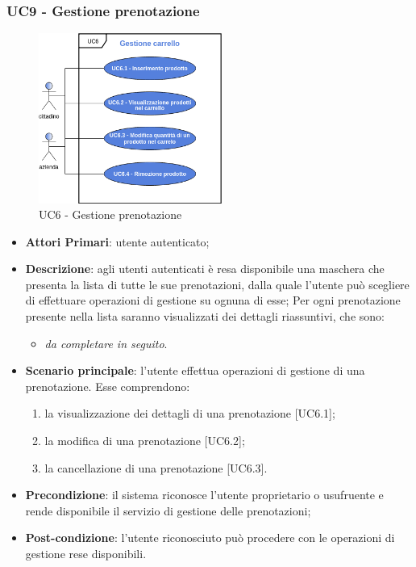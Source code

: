 \subsubsection{UC9 - Gestione prenotazione}
 \begin{figure}[h]
	\includegraphics[width=6cm]{res/images/UC6GestioneCarrello.png}
	\centering
	\caption{UC6 - Gestione prenotazione}
\end{figure}
\begin{itemize}
	\item \textbf{Attori Primari}: utente autenticato;
	\item \textbf{Descrizione}: agli utenti autenticati è resa disponibile una maschera che presenta la lista di tutte le sue prenotazioni, dalla quale l'utente può scegliere di effettuare operazioni di gestione su ognuna di esse;
	Per ogni prenotazione presente nella lista saranno visualizzati dei dettagli riassuntivi, che sono:
	\begin{itemize}
		\item \textit{da completare in seguito}.
	\end{itemize}
	\item \textbf{Scenario principale}: l'utente effettua operazioni di gestione di una prenotazione. Esse comprendono:
	\begin{enumerate}[label=\alph*.]
		\item la visualizzazione dei dettagli di una prenotazione [UC6.1];
		\item la modifica di una prenotazione [UC6.2];
		\item la cancellazione di una prenotazione [UC6.3].
	\end{enumerate}
	\item \textbf{Precondizione}: il sistema riconosce l'utente proprietario o usufruente e rende disponibile il servizio di gestione delle prenotazioni;
	\item \textbf{Post-condizione}: l'utente riconosciuto può procedere con le operazioni di gestione rese disponibili.
\end{itemize} 
